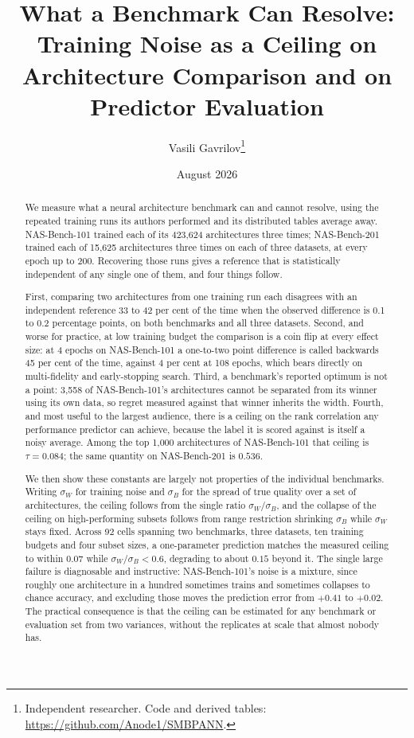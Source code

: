 \documentclass[11pt]{article}
\title{\textbf{What a Benchmark Can Resolve: Training Noise as a Ceiling on\\
Architecture Comparison and on Predictor Evaluation}}
\author{Vasili Gavrilov\thanks{Independent researcher. Code and derived tables:
\url{https://github.com/Anode1/SMBPANN}.}}
\date{August 2026}
\begin{document}
\maketitle

\begin{abstract}
We measure what a neural architecture benchmark can and cannot resolve, using the repeated training runs
its authors performed and its distributed tables average away. NAS-Bench-101 trained each of its 423,624
architectures three times; NAS-Bench-201 trained each of 15,625 architectures three times on each of
three datasets, at every epoch up to 200. Recovering those runs gives a reference that is statistically
independent of any single one of them, and four things follow.

First, comparing two architectures from one training run each disagrees with an independent reference
33 to 42 per cent of the time when the observed difference is 0.1 to 0.2 percentage points, on both
benchmarks and all three datasets. Second, and worse for practice, at low training budget the comparison
is a coin flip at every effect size: at 4 epochs on NAS-Bench-101 a one-to-two point difference is called
backwards 45 per cent of the time, against 4 per cent at 108 epochs, which bears directly on
multi-fidelity and early-stopping search. Third, a benchmark's reported optimum is not a point: 3,558 of
NAS-Bench-101's architectures cannot be separated from its winner using its own data, so regret measured
against that winner inherits the width. Fourth, and most useful to the largest audience, there is a
ceiling on the rank correlation any performance predictor can achieve, because the label it is scored
against is itself a noisy average. Among the top 1,000 architectures of NAS-Bench-101 that ceiling is
$\tau = 0.084$; the same quantity on NAS-Bench-201 is $0.536$.

We then show these constants are largely not properties of the individual benchmarks. Writing $\sigma_W$
for training noise and $\sigma_B$ for the spread of true quality over a set of architectures, the ceiling
follows from the single ratio $\sigma_W/\sigma_B$, and the collapse of the ceiling on high-performing
subsets follows from range restriction shrinking $\sigma_B$ while $\sigma_W$ stays fixed. Across 92 cells
spanning two benchmarks, three datasets, ten training budgets and four subset sizes, a one-parameter
prediction matches the measured ceiling to within $0.07$ while $\sigma_W/\sigma_B < 0.6$, degrading to
about $0.15$ beyond it. The single large failure is diagnosable and instructive: NAS-Bench-101's noise is
a mixture, since roughly one architecture in a hundred sometimes trains and sometimes collapses to chance
accuracy, and excluding those moves the prediction error from $+0.41$ to $+0.02$. The practical
consequence is that the ceiling can be estimated for any benchmark or evaluation set from two variances,
without the replicates at scale that almost nobody has.
\end{abstract}
\end{document}
